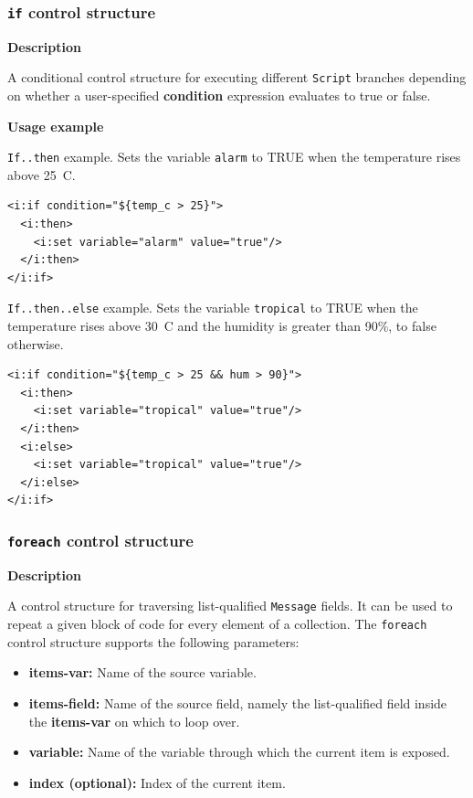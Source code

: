 \subsubsection{\texttt{if} control structure}

\textbf{Description}

A conditional control structure for executing different \texttt{Script} branches
depending on whether a user-specified \textbf{condition} expression evaluates
to true or false.

\textbf{Usage example}

\texttt{If..then} example. Sets the variable \texttt{alarm} to TRUE when the
temperature rises above 25\degree~C.

\lstset{language=XML}
\begin{lstlisting}
<i:if condition="${temp_c > 25}"> 
  <i:then>
    <i:set variable="alarm" value="true"/>
  </i:then>
</i:if>
\end{lstlisting}

\texttt{If..then..else} example. Sets the variable \texttt{tropical} to TRUE
when the temperature rises above 30\degree~C and the humidity is greater than
90\%, to false otherwise.

\lstset{language=XML}
\begin{lstlisting}
<i:if condition="${temp_c > 25 && hum > 90}"> 
  <i:then>
    <i:set variable="tropical" value="true"/>
  </i:then>
  <i:else>
    <i:set variable="tropical" value="true"/>
  </i:else>
</i:if>
\end{lstlisting}


\subsubsection{\texttt{foreach} control structure}

\textbf{Description}

A control structure for traversing list-qualified \texttt{Message} fields. It
can be used to repeat a given block of code for every element of a collection.
The \texttt{foreach} control structure supports the following parameters:

\begin{itemize}

    \item \textbf{items-var:} Name of the source variable.

    \item \textbf{items-field:} Name of the source field, namely the
        list-qualified field inside the \textbf{items-var} on which to loop
        over.

    \item \textbf{variable:} Name of the variable through which the current
        item is exposed.

    \item \textbf{index (optional):} Index of the current item.

\end{itemize}

